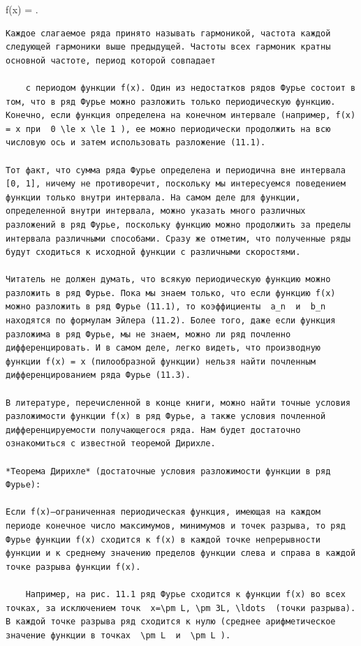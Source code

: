 \documentclass[
  ukrainian,
]{article}
\begin{document}
f(x) = 
.

\begin{verbatim}
Каждое слагаемое ряда принято называть гармоникой, частота каждой следующей гармоники выше предыдущей. Частоты всех гармоник кратны основной частоте, период которой совпадает

    с периодом функции f(x). Один из недостатков рядов Фурье состоит в том, что в ряд Фурье можно разложить только периодическую функцию. Конечно, если функция определена на конечном интервале (например, f(x) = x при  0 \le x \le 1 ), ее можно периодически продолжить на всю числовую ось и затем использовать разложение (11.1).

Тот факт, что сумма ряда Фурье определена и периодична вне интервала [0, 1], ничему не противоречит, поскольку мы интересуемся поведением функции только внутри интервала. На самом деле для функции, определенной внутри интервала, можно указать много различных разложений в ряд Фурье, поскольку функцию можно продолжить за пределы интервала различными способами. Сразу же отметим, что полученные ряды будут сходиться к исходной функции с различными скоростями.

Читатель не должен думать, что всякую периодическую функцию можно разложить в ряд Фурье. Пока мы знаем только, что если функцию f(x) можно разложить в ряд Фурье (11.1), то коэффициенты  a_n  и  b_n  находятся по формулам Эйлера (11.2). Более того, даже если функция разложима в ряд Фурье, мы не знаем, можно ли ряд почленно дифференцировать. И в самом деле, легко видеть, что производную функции f(x) = x (пилообразной функции) нельзя найти почленным дифференцированием ряда Фурье (11.3).

В литературе, перечисленной в конце книги, можно найти точные условия разложимости функции f(x) в ряд Фурье, а также условия почленной дифференцируемости получающегося ряда. Нам будет достаточно ознакомиться с известной теоремой Дирихле.

*Теорема Дирихле* (достаточные условия разложимости функции в ряд Фурье):

Если f(x)—ограниченная периодическая функция, имеющая на каждом периоде конечное число максимумов, минимумов и точек разрыва, то ряд Фурье функции f(x) сходится к f(x) в каждой точке непрерывности функции и к среднему значению пределов функции слева и справа в каждой точке разрыва функции f(x).

    Например, на рис. 11.1 ряд Фурье сходится к функции f(x) во всех точках, за исключением точк  x=\pm L, \pm 3L, \ldots  (точки разрыва). В каждой точке разрыва ряд сходится к нулю (среднее арифметическое значение функции в точках  \pm L  и  \pm L ).


\end{verbatim}
\end{document}
